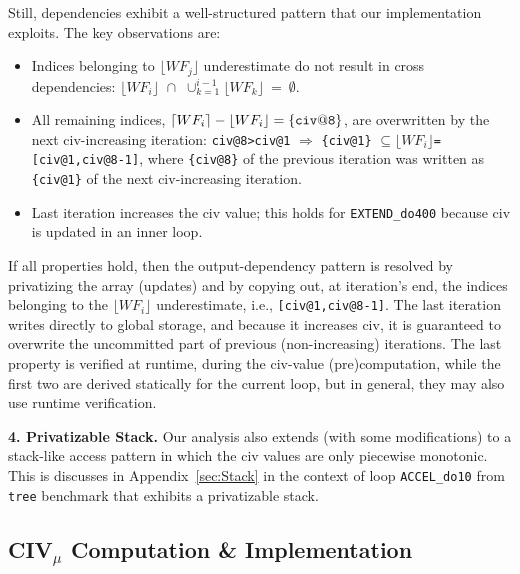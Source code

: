 \documentclass{sig-alternate}
\begin{document}
Still, dependencies exhibit a well-structured pattern that our 
implementation exploits. The key observations are: 
\begin{itemize}
    \item Indices belonging to $\lfloor{}WF_{j}\rfloor$ underestimate  
            do not result in cross dependencies:
        $\lfloor WF_{i}\rfloor\mbox{~}\cap\mbox{~}\cup_{k=1}^{i-1}\lfloor WF_{k}\rfloor~=~\emptyset$.

    \item All remaining indices, 
        $\lceil WF_{i}\rceil - \lfloor WF_{i}\rfloor = {\tt\{civ@8\}}$,
        are overwritten by the next {\sc civ}-increasing iteration:
        {\tt{}civ@8>civ@1} $\Rightarrow$
        {\tt\{civ@1\}} $\subseteq\lfloor WF_{i}\rfloor${\tt=[civ@1,civ@8-1]},
        where {\tt\{civ@8\}} of the previous iteration was written as 
        {\tt\{civ@1\}} of the next {\sc civ}-increasing iteration.

    \item Last iteration increases the {\sc civ} value; this 
        holds for {\tt EXTEND\_do400} because {\sc civ} is 
        updated in an inner loop.
\end{itemize}

If all properties hold, then the output-dependency pattern is resolved 
by privatizing the array (updates) and by copying out, at iteration's
end, the indices belonging to the $\lfloor WF_i\rfloor$ 
underestimate, i.e., {\tt[civ@1,civ@8-1]}.
The last iteration writes directly to global storage, and because
it increases {\sc civ}, it is guaranteed to overwrite the uncommitted 
part of previous (non-increasing) iterations.
%
The last property is verified at runtime, during the {\sc civ}-value
(pre)computation, while the first two are derived statically 
for the current loop, but in general, they may also use runtime verification.

\vspace{1ex}
{\bf 4. Privatizable Stack.} Our analysis also extends (with
some modifications) to a stack-like access pattern in which
the {\sc civ} values are only piecewise monotonic.
This is discusses in Appendix~\ref{sec:Stack} in the
context of loop {\tt ACCEL\_do10} from {\tt tree} benchmark
that exhibits a privatizable stack. 


\subsection{CIV$_\mu$ Computation \& Implementation }
\label{subsect:CivImplem}
\end{document}
